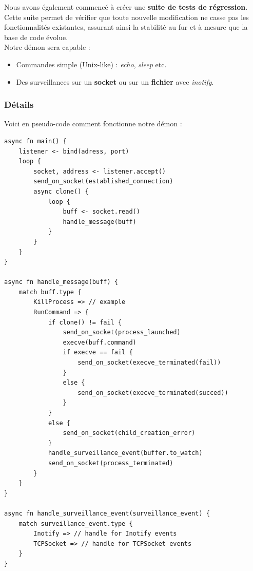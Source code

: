 \documentclass{article}
\begin{document}
Nous avons également commencé à créer une \textbf{suite de tests de régression}. Cette suite permet de vérifier que toute nouvelle modification ne casse pas les fonctionnalités existantes, assurant ainsi la stabilité au fur et à mesure que la base de code évolue.\\

Notre démon sera capable : 
\begin{itemize}
    \item Commandes simple (Unix-like) : \textit{echo}, \textit{sleep} etc.
    \item Des surveillances sur un \textbf{socket} ou sur un \textbf{fichier} avec \textit{inotify}.
\end{itemize}


\subsubsection{Détails}

Voici en pseudo-code comment fonctionne notre démon :

\begin{verbatim}
async fn main() {
    listener <- bind(adress, port)
    loop {
        socket, address <- listener.accept()
        send_on_socket(established_connection)
        async clone() {
            loop {
                buff <- socket.read()
                handle_message(buff)
            }
        }
    }
}

async fn handle_message(buff) {
    match buff.type {
        KillProcess => // example
        RunCommand => {
            if clone() != fail {
                send_on_socket(process_launched)
                execve(buff.command)
                if execve == fail {
                    send_on_socket(execve_terminated(fail))
                }
                else {
                    send_on_socket(execve_terminated(succed))
                }
            }
            else {
                send_on_socket(child_creation_error)
            }
            handle_surveillance_event(buffer.to_watch)
            send_on_socket(process_terminated)
        }
    }
}

async fn handle_surveillance_event(surveillance_event) {
    match surveillance_event.type {
        Inotify => // handle for Inotify events
        TCPSocket => // handle for TCPSocket events
    }
}
\end{verbatim}
\end{document}
